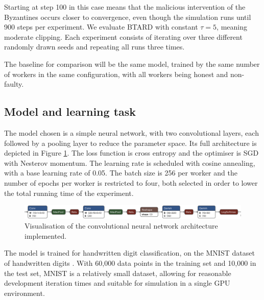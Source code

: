 \documentclass{article}
\begin{document}
Starting at step 100 in this case means that the malicious intervention of the Byzantines occurs closer to convergence, even though the simulation runs until 900 steps per experiment. We evaluate BTARD with constant $\tau = 5$, meaning moderate clipping. Each experiment consists of iterating over three different randomly drawn seeds and repeating all runs three times. 

The baseline for comparison will be the same model, trained by the same number of workers in the same configuration, with all workers being honest and non-faulty.

\subsection{Model and learning task}
The model chosen is a simple neural network, with two convolutional layers, each followed by a pooling layer to reduce the parameter space. Its full architecture is depicted in Figure \ref{fig:model}. The loss function is cross entropy and the optimiser is SGD with Nesterov momentum. The learning rate is scheduled with cosine annealing, with a base learning rate of 0.05. The batch size is 256 per worker and the number of epochs per worker is restricted to four, both selected in order to lower the total running time of the experiment.

\begin{figure}[h]
\centering
\includegraphics[width=\textwidth]{figs/cnn-shorter.png}
\caption{Visualisation of the convolutional neural network architecture implemented.}
\label{fig:model}
\end{figure}

The model is trained for handwritten digit classification, on the MNIST dataset of handwritten digits \citep{lecun1998gradient, mnist_database}. With 60,000 data points in the training set and 10,000 in the test set, MNIST is a relatively small dataset, allowing for reasonable development iteration times and suitable for simulation in a single GPU environment. %
\end{document}
